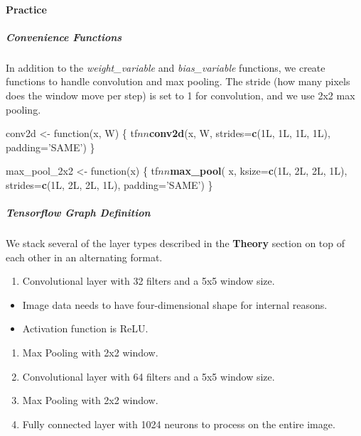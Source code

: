 \documentclass[]{article}
\newenvironment{Shaded}{\begin{snugshade}}{\end{snugshade}}
\newcommand{\KeywordTok}[1]{\textcolor[rgb]{0.13,0.29,0.53}{\textbf{{#1}}}}
\newcommand{\DataTypeTok}[1]{\textcolor[rgb]{0.13,0.29,0.53}{{#1}}}
\newcommand{\StringTok}[1]{\textcolor[rgb]{0.31,0.60,0.02}{{#1}}}
\newcommand{\NormalTok}[1]{{#1}}
\providecommand{\tightlist}{%
  \setlength{\itemsep}{0pt}\setlength{\parskip}{0pt}}
\let\oldparagraph\paragraph
\renewcommand{\paragraph}[1]{\oldparagraph{#1}\mbox{}}
\let\oldsubparagraph\subparagraph
\renewcommand{\subparagraph}[1]{\oldsubparagraph{#1}\mbox{}}
\begin{document}
\paragraph{Practice}\label{practice}

\subparagraph{Convenience Functions}\label{convenience-functions}

In addition to the \emph{weight\_variable} and \emph{bias\_variable}
functions, we create functions to handle convolution and max pooling.
The stride (how many pixels does the window move per step) is set to 1
for convolution, and we use 2x2 max pooling.

\begin{Shaded}
\begin{Highlighting}[]
\NormalTok{conv2d <-}\StringTok{ }\NormalTok{function(x, W) \{}
  \NormalTok{tf$nn$}\KeywordTok{conv2d}\NormalTok{(x, W, }\DataTypeTok{strides=}\KeywordTok{c}\NormalTok{(1L, 1L, 1L, 1L), }\DataTypeTok{padding=}\StringTok{'SAME'}\NormalTok{)}
\NormalTok{\}}

\NormalTok{max_pool_2x2 <-}\StringTok{ }\NormalTok{function(x) \{}
  \NormalTok{tf$nn$}\KeywordTok{max_pool}\NormalTok{(}
    \NormalTok{x,}
    \DataTypeTok{ksize=}\KeywordTok{c}\NormalTok{(1L, 2L, 2L, 1L),}
    \DataTypeTok{strides=}\KeywordTok{c}\NormalTok{(1L, 2L, 2L, 1L),}
    \DataTypeTok{padding=}\StringTok{'SAME'}\NormalTok{)}
\NormalTok{\}}
\end{Highlighting}
\end{Shaded}

\subparagraph{Tensorflow Graph
Definition}\label{tensorflow-graph-definition}

We stack several of the layer types described in the \textbf{Theory}
section on top of each other in an alternating format.

\begin{enumerate}
\def\labelenumi{\arabic{enumi})}
\tightlist
\item
  Convolutional layer with 32 filters and a 5x5 window size.
\end{enumerate}

\begin{itemize}
\tightlist
\item
  Image data needs to have four-dimensional shape for internal reasons.
\item
  Activation function is ReLU.
\end{itemize}

\begin{enumerate}
\def\labelenumi{\arabic{enumi})}
\setcounter{enumi}{1}
\tightlist
\item
  Max Pooling with 2x2 window.
\item
  Convolutional layer with 64 filters and a 5x5 window size.
\item
  Max Pooling with 2x2 window.
\item
  Fully connected layer with 1024 neurons to process on the entire
  image.
\end{enumerate}
\end{document}
